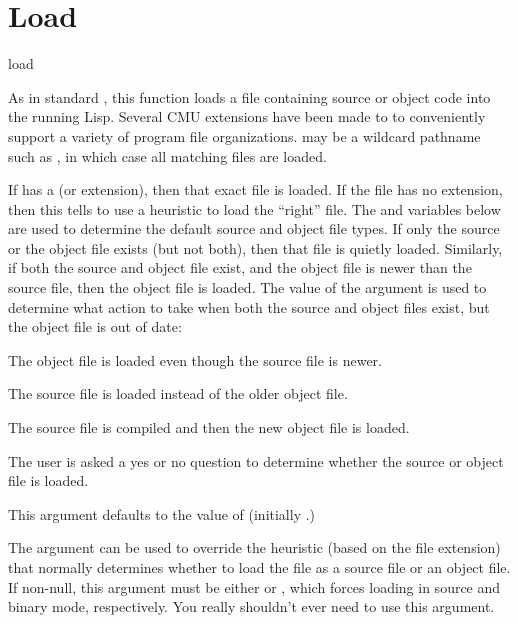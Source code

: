 \section{Load}

\begin{defun}{}{load}{%
    }
  
  As in standard \clisp{}, this function loads a file containing
  source or object code into the running Lisp.  Several CMU extensions
  have been made to  to conveniently support a variety of
  program file organizations.   may be a wildcard
  pathname such as , in which case all matching files are
  loaded.
  
  If  has a  (or extension), then
  that exact file is loaded.  If the file has no extension, then this
  tells  to use a heuristic to load the ``right'' file.
  The  and 
  variables below are used to determine the default source and object
  file types.  If only the source or the object file exists (but not
  both), then that file is quietly loaded.  Similarly, if both the
  source and object file exist, and the object file is newer than the
  source file, then the object file is loaded.  The value of the
   argument is used to determine what action to
  take when both the source and object files exist, but the object
  file is out of date:
  \begin{Lentry}
  \item[\kwd{load-object}] The object file is loaded even though the
    source file is newer.
    
  \item[\kwd{load-source}] The source file is loaded instead of the
    older object file.
    
  \item[\kwd{compile}] The source file is compiled and then the new
    object file is loaded.
    
  \item[\kwd{query}] The user is asked a yes or no question to
    determine whether the source or object file is loaded.
  \end{Lentry}
  This argument defaults to the value of
   (initially .)
  
  The  argument can be used to override the heuristic
  (based on the file extension) that normally determines whether to
  load the file as a source file or an object file.  If non-null, this
  argument must be either  or , which forces
  loading in source and binary mode, respectively. You really
  shouldn't ever need to use this argument.
\end{defun}

